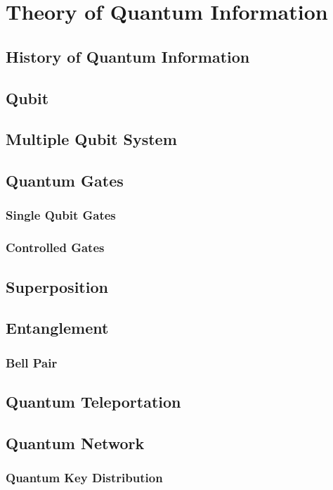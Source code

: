 \chapter{Theory of Quantum Information}
\label{theory_of_quantum_information}
\section{History of Quantum Information}

\section{Qubit}

\section{Multiple Qubit System}

\section{Quantum Gates}
\subsection{Single Qubit Gates}
\subsection{Controlled Gates}

\section{Superposition}

\section{Entanglement}
\subsection{Bell Pair}

\section{Quantum Teleportation}

\clearpage
\section{Quantum Network}
\subsection{Quantum Key Distribution}
